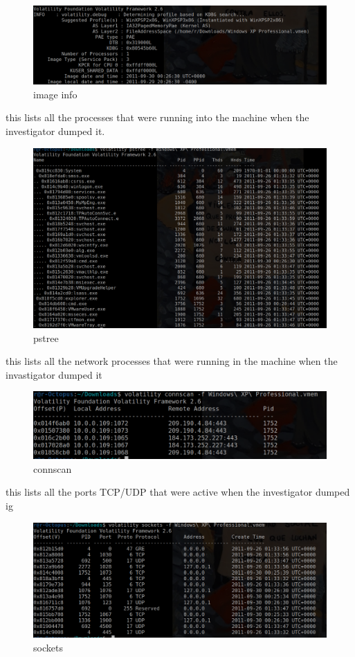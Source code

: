\documentclass[10pt,a4paper]{article} %
\begin{document}
    \begin{figure}[h!]
        \centering
        \includegraphics[width=0.8\linewidth]{imageinfo.png}
        \caption{image info}
        \label{volatility1}
    \end{figure}

    this lists all the processes that were running into the machine when the
    investigator dumped it.
    \begin{figure}[h!]
        \centering
        \includegraphics[width=1\linewidth]{pstree.png}
        \caption{pstree}
        \label{fig}
    \end{figure}

    this lists all the network processes that were running in the machine when
    the invastigator dumped it
    \begin{figure}[h!]
        \centering
        \includegraphics[width=0.8\linewidth]{connscan.png}
        \caption{connscan}
        \label{fig}
    \end{figure}

    this lists all the ports TCP/UDP that were active when the investigator dumped ig
    \begin{figure}[h!]
        \centering
        \includegraphics[width=0.8\linewidth]{sockets.png}
        \caption{sockets}
        \label{fig}
    \end{figure}
\end{document}
